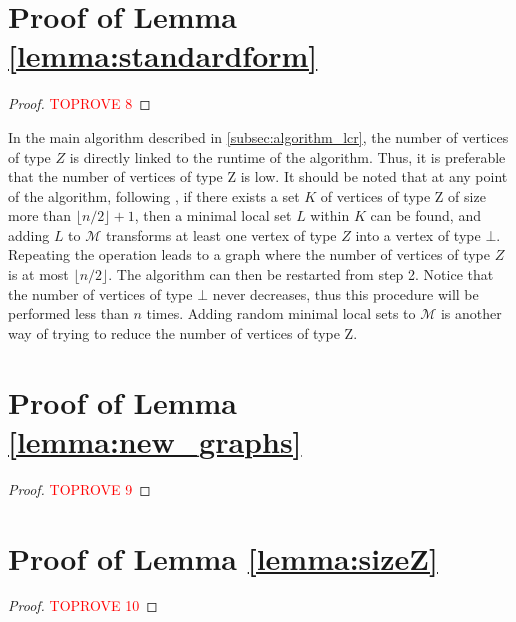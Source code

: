 \documentclass[a4paper,UKenglish,cleveref,autoref,thm-restate]{arxiv}
\begin{document}
\section{Proof of Lemma \ref{lemma:standardform}} \label{app:standardform}

\standardform*

\begin{proof}\textcolor{red}{TOPROVE 8}\end{proof}

\begin{remark}
    In the main algorithm described in \cref{subsec:algorithm_lcr}, the number of vertices of type $Z$ is directly linked to the runtime of the algorithm. Thus, it is preferable that the number of vertices of type Z is low. It should be noted that at any point of the algorithm, following \cite{claudet2024local}, if there exists a set $K$ of vertices of type Z of size more than $\lfloor n/2 \rfloor +1$, then a minimal local set $L$ within $K$ can be found, and adding $L$ to $\mathcal M$ transforms at least one vertex of type $Z$ into a vertex of type $\bot$. Repeating the operation leads to a graph where the number of vertices of type $Z$ is at most $\lfloor n/2 \rfloor$. The algorithm can then be restarted from step 2. Notice that the number of vertices of type $\bot$ never decreases, thus this procedure will be performed less than $n$ times. Adding random minimal local sets to $\mathcal M$ is another way of trying to reduce the number of vertices of type Z.
\end{remark}

\section{Proof of Lemma \ref{lemma:new_graphs}} \label{app:new_graphs}

\newgraphs*

\begin{proof}\textcolor{red}{TOPROVE 9}\end{proof}

\section{Proof of Lemma \ref{lemma:sizeZ}} \label{app:sizeZ}

\sizeZ*

\begin{proof}\textcolor{red}{TOPROVE 10}\end{proof}
\end{document}
